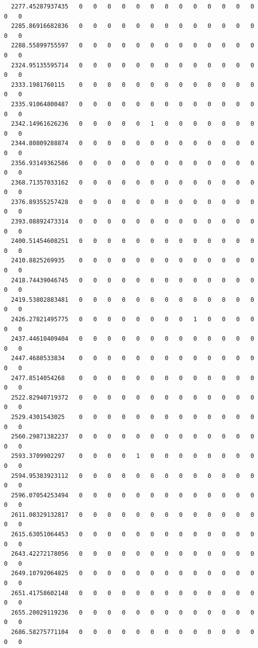 \documentclass[
  letterpaper,
  DIV=11,
  numbers=noendperiod]{scrartcl}
\begin{document}
\begin{verbatim}
  2277.45287937435   0   0   0   0   0   0   0   0   0   0   0   0   0   0   0
  2285.86916682836   0   0   0   0   0   0   0   0   0   0   0   0   0   0   0
  2288.55899755597   0   0   0   0   0   0   0   0   0   0   0   0   0   0   0
  2324.95135595714   0   0   0   0   0   0   0   0   0   0   0   0   0   0   0
  2333.1981760115    0   0   0   0   0   0   0   0   0   0   0   0   0   0   0
  2335.91064800487   0   0   0   0   0   0   0   0   0   0   0   0   0   0   0
  2342.14961626236   0   0   0   0   0   1   0   0   0   0   0   0   0   0   0
  2344.80809288874   0   0   0   0   0   0   0   0   0   0   0   0   0   0   0
  2356.93149362586   0   0   0   0   0   0   0   0   0   0   0   0   0   0   0
  2368.71357033162   0   0   0   0   0   0   0   0   0   0   0   0   0   0   0
  2376.89355257428   0   0   0   0   0   0   0   0   0   0   0   0   0   0   0
  2393.08892473314   0   0   0   0   0   0   0   0   0   0   0   0   0   0   0
  2400.51454608251   0   0   0   0   0   0   0   0   0   0   0   0   0   0   0
  2410.8825269935    0   0   0   0   0   0   0   0   0   0   0   0   0   0   0
  2418.74439046745   0   0   0   0   0   0   0   0   0   0   0   0   0   0   0
  2419.53802883481   0   0   0   0   0   0   0   0   0   0   0   0   0   0   0
  2426.27821495775   0   0   0   0   0   0   0   0   1   0   0   0   0   0   0
  2437.44610409404   0   0   0   0   0   0   0   0   0   0   0   0   0   0   0
  2447.4688533834    0   0   0   0   0   0   0   0   0   0   0   0   0   0   0
  2477.8514054268    0   0   0   0   0   0   0   0   0   0   0   0   0   0   0
  2522.82940719372   0   0   0   0   0   0   0   0   0   0   0   0   0   0   0
  2529.4301543025    0   0   0   0   0   0   0   0   0   0   0   0   0   0   0
  2560.29871382237   0   0   0   0   0   0   0   0   0   0   0   0   0   0   0
  2593.3709902297    0   0   0   0   1   0   0   0   0   0   0   0   0   0   0
  2594.95383923112   0   0   0   0   0   0   0   0   0   0   0   0   0   0   0
  2596.07054253494   0   0   0   0   0   0   0   0   0   0   0   0   0   0   0
  2611.08329132817   0   0   0   0   0   0   0   0   0   0   0   0   0   0   0
  2615.63051064453   0   0   0   0   0   0   0   0   0   0   0   0   0   0   0
  2643.42272178056   0   0   0   0   0   0   0   0   0   0   0   0   0   0   0
  2649.10792064825   0   0   0   0   0   0   0   0   0   0   0   0   0   0   0
  2651.41758602148   0   0   0   0   0   0   0   0   0   0   0   0   0   0   0
  2655.20029119236   0   0   0   0   0   0   0   0   0   0   0   0   0   0   0
  2686.58275771104   0   0   0   0   0   0   0   0   0   0   0   0   0   0   0

\end{verbatim}
\end{document}
